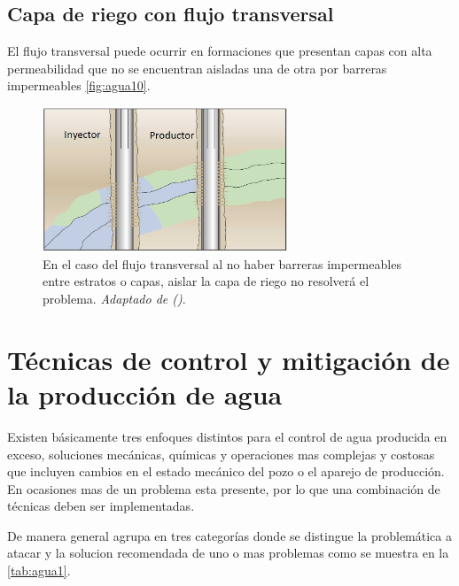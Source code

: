 \subsection{Capa de riego con flujo transversal}
El flujo transversal puede ocurrir en formaciones que presentan capas con alta permeabilidad que no se encuentran aisladas una de otra por barreras impermeables \autoref{fig:agua10}.

\begin{figure}\centering
    \includegraphics[width=0.65\textwidth]{Graphics/agua10.png}
    \caption[Capa de riego con flujo transversal]{En el caso del flujo transversal al no haber barreras impermeables entre estratos o capas, aislar la capa de riego no resolverá el problema. \emph{Adaptado de (\cite{Bailey2000})}.}
    \label{fig:agua10}
\end{figure}


\section{Técnicas de control y mitigación de la producción de agua}
Existen básicamente tres enfoques distintos para el control de agua producida en exceso, soluciones mecánicas, químicas y operaciones mas complejas y costosas que incluyen cambios en el estado mecánico del pozo o el aparejo de producción. En ocasiones mas de un problema esta presente, por lo que una combinación de técnicas deben ser implementadas.

De manera general \cite{Seright2001} agrupa en tres categorías donde se distingue la problemática a atacar y la solucion recomendada de uno o mas problemas como se muestra en la \autoref{tab:agua1}.

